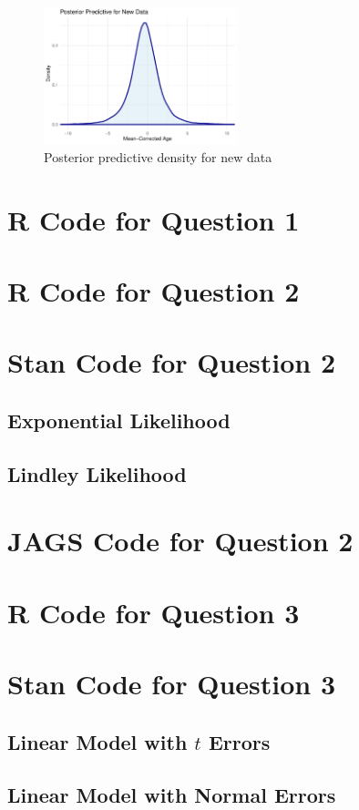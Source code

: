 \documentclass[10pt]{extarticle}
\begin{document}
\begin{figure}[H]
	\centering
	\includegraphics[width = 0.5\textwidth]{../pprednd}
	\caption{Posterior predictive density for new data}
	\label{fig:ppnd}
\end{figure}

\printbibliography

\appendix

\section{R Code for Question 1}

\section{R Code for Question 2}

\section{Stan Code for Question 2}
\subsection{Exponential Likelihood}

\subsection{Lindley Likelihood}

\section{JAGS Code for Question 2}

\section{R Code for Question 3}

\section{Stan Code for Question 3}
\subsection{Linear Model with $t$ Errors}

\subsection{Linear Model with Normal Errors}

\end{document}
